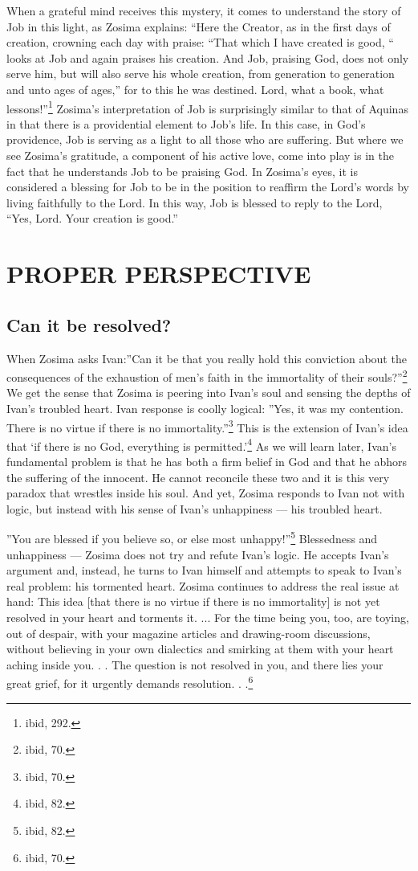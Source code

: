 When a grateful mind receives this mystery, it comes to understand the story of Job in this light, as Zosima explains: ``Here the Creator, as in the first days of creation, crowning each day with praise: ``That which I have created is good, `` looks at Job and again praises his creation. And Job, praising God, does not only serve him, but will also serve his whole creation, from generation to generation and unto ages of ages,'' for to this he was destined. Lord, what a book, what lessons!''\footnote{ibid, 292.} Zosima's interpretation of Job is surprisingly similar to that of Aquinas in that there is a providential element to Job's life. In this case, in God's providence, Job is serving as a light to all those who are suffering. But where we see Zosima's gratitude, a component of his active love, come into play is in the fact that he understands Job to be praising God. In Zosima's eyes, it is considered a blessing for Job to be in the position to reaffirm the Lord's words by living faithfully to the Lord. In this way, Job is blessed to reply to the Lord, ``Yes, Lord. Your creation is good.''

\chapter{PROPER PERSPECTIVE}
	\section{Can it be resolved?}

When Zosima asks Ivan:''Can it be that you really hold this conviction about the consequences of the exhaustion of men's faith in the immortality of their souls?''\footnote{ibid, 70.} We get the sense that Zosima is peering into Ivan's soul and sensing the depths of Ivan's troubled heart. Ivan response is coolly logical: ''Yes, it was my contention. There is no virtue if there is no immortality.''\footnote{ibid, 70.} This is the extension of Ivan's idea that `if there is no God, everything is permitted.'\footnote{ibid, 82.} As we will learn later, Ivan's fundamental problem is that he has both a firm belief in God and that he abhors the suffering of the innocent. He cannot reconcile these two and it is this very paradox that wrestles inside his soul. And yet, Zosima responds to Ivan not with logic, but instead with his sense of Ivan's unhappiness --- his troubled heart.

''You are blessed if you believe so, or else most unhappy!''\footnote{ibid, 82.} Blessedness and unhappiness --- Zosima does not try and refute Ivan's logic. He accepts Ivan's argument and, instead, he turns to Ivan himself and attempts to speak to Ivan's real problem: his tormented heart. Zosima continues to address the real issue at hand: 
This idea [that there is no virtue if there is no immortality] is not yet resolved in your heart and torments it. ... For the time being you, too, are toying, out of despair, with your magazine articles and drawing-room discussions, without believing in your own dialectics and smirking at them with your heart aching inside you. . . The question is not resolved in you, and there lies your great grief, for it urgently demands resolution. . .\footnote{ibid, 70.}

